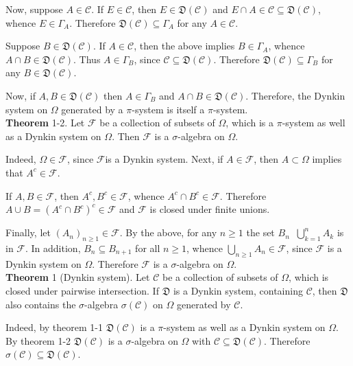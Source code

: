 \documentclass[a4paper]{article}
\newcommand{\brac}[1]{\left ( #1 \right )}
\newcommand{\Ccal}{\mathcal{C}}
\newcommand{\Fcal}{\mathcal{F}}
\newcommand{\Dyns}[1]{\mathfrak{D}\brac{#1}}
\newcommand{\defn}{\mathop{\overset{\Delta}{=}}\nolimits}
\begin{document}
Now, suppose $A\in \Ccal$. If $E\in \Ccal$, then $E\in \Dyns{\Ccal}$ and $E\cap A\in \Ccal\subseteq \Dyns{\Ccal}$, whence $E\in \Gamma_A$. Therefore $\Dyns{\Ccal}\subseteq \Gamma_A$ for any $A\in \Ccal$.

Suppose $B\in \Dyns{\Ccal}$. If $A\in \Ccal$, then the above implies $B\in \Gamma_A$, whence $A\cap B\in \Dyns{\Ccal}$. Thus $A\in \Gamma_B$, since $\Ccal\subseteq\Dyns{\Ccal}$. Therefore $\Dyns{\Ccal}\subseteq \Gamma_B$ for any $B\in \Dyns{\Ccal}$.

Now, if $A,B\in \Dyns{\Ccal}$ then $A\in \Gamma_B$ and $A\cap B\in \Dyns{\Ccal}$. Therefore, the Dynkin system on $\Omega$ generated by a $\pi$-system is itself a $\pi$-system.\\

\label{thm:dynkin_pi_sigma} \noindent \textbf{Theorem} 1-2.
Let $\Fcal$ be a collection of subsets of $\Omega$, which is a $\pi$-system as well as a Dynkin system on $\Omega$. Then $\Fcal$ is a $\sigma$-algebra on $\Omega$.

Indeed, $\Omega\in \Fcal$, since $\Fcal$is a Dynkin system. Next, if $A\in \Fcal$, then $A\subset \Omega$ implies that $A^c\in \Fcal$.

If $A,B\in \Fcal$, then $A^c, B^c\in \Fcal$, whence $A^c\cap B^c\in \Fcal$. Therefore $A\cup B = \brac{A^c\cap B^c}^c\in \Fcal$ and $\Fcal$ is closed under finite unions.

Finally, let $\brac{A_n}_{n\geq1}\in \Fcal$. By the above, for any $n\geq1$ the set $B_n\defn \bigcup_{k=1}^n A_k$ is in $\Fcal$. In addition, $B_n\subseteq B_{n+1}$ for all $n\geq1$, whence $\bigcup_{n\geq1}A_n \in \Fcal$, since $\Fcal$ is a Dynkin system on $\Omega$. Therefore $\Fcal$ is a $\sigma$-algebra on $\Omega$.\\

\label{thm:dynkin_system} \noindent \textbf{Theorem} 1 (Dynkin system).
Let $\Ccal$ be a collection of subsets of $\Omega$, which is closed under pairwise intersection. If $\mathfrak{D}$ is a Dynkin system, containing $\Ccal$, then $\mathfrak{D}$ also contains the $\sigma$-algebra $\sigma\brac{\Ccal}$ on $\Omega$ generated by $\Ccal$.

Indeed, by theorem 1-1 $\Dyns{\Ccal}$ is a $\pi$-system as well as a Dynkin system on $\Omega$. By theorem 1-2 $\Dyns{\Ccal}$ is a $\sigma$-algebra on $\Omega$ with $\Ccal\subseteq\Dyns{\Ccal}$. Therefore $\sigma\brac{\Ccal}\subseteq\Dyns{\Ccal}$.\\

\end{document}
